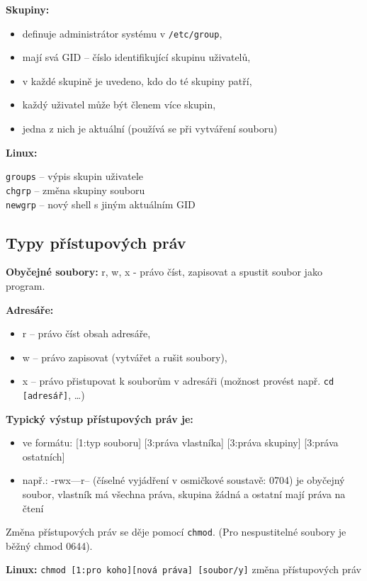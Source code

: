 \documentclass[a4paper, 11pt]{article}
\newcommand{\tcmd}[1]{\texttt{#1}}
\begin{document}
\textbf{Skupiny:}
\begin{itemize}
    \item definuje administrátor systému v \tcmd{/etc/group},
    \item mají svá GID -- číslo identifikující skupinu uživatelů,
    \item v každé skupině je uvedeno, kdo do té skupiny patří,
    \item každý uživatel může být členem více skupin,
    \item jedna z nich je aktuální (používá se při vytváření souboru)
\end{itemize}
 
\textbf{Linux:}

\tcmd{groups} -- výpis skupin uživatele \\[0.2em]
\tcmd{chgrp} -- změna skupiny souboru \\[0.2em]
\tcmd{newgrp} -- nový shell s jiným aktuálním GID

\subsection{Typy přístupových práv}
\textbf{Obyčejné soubory:} r, w, x - právo číst, zapisovat a spustit soubor jako program.
 
\textbf{Adresáře:}
\begin{itemize}
    \item r -- právo číst obsah adresáře,
    \item w -- právo zapisovat (vytvářet a rušit soubory),
    \item x -- právo přistupovat k souborům v adresáři (možnost provést např. \tcmd{cd [adresář]}, \ldots)
\end{itemize}
 
\textbf{Typický výstup přístupových práv je:}
\begin{itemize}
    \item ve formátu: [1:typ souboru] [3:práva vlastníka] [3:práva skupiny] [3:práva ostatních]
    \item např.: -rwx---r-- (číselné vyjádření v osmičkové soustavě: 0704) je obyčejný soubor, vlastník má všechna práva, skupina žádná a ostatní mají práva na čtení
\end{itemize}
 
Změna přístupových práv se děje pomocí \tcmd{chmod}. (Pro nespustitelné soubory je běžný chmod 0644).
 
\textbf{Linux:}
\tcmd{chmod [1:pro koho][nová práva] [soubor/y]} změna přístupových práv
\end{document}
